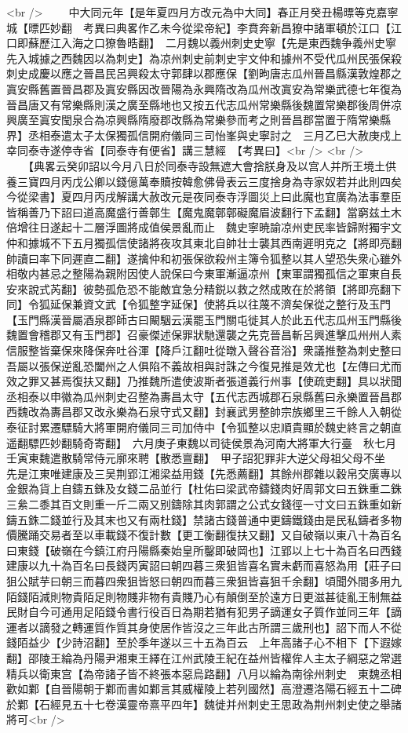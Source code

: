 <br />
　　中大同元年【是年夏四月方改元為中大同】春正月癸丑楊㬓等克嘉寧城【㬓匹妙翻　考異曰典畧作乙未今從梁帝紀】李賁奔新昌獠中諸軍頓於江口【江口即蘇歷江入海之口獠魯晧翻】　二月魏以義州刺史史寧【先是東西魏争義州史寧先入城據之西魏因以為刺史】為凉州刺史前刺史宇文仲和據州不受代瓜州民張保殺刺史成慶以應之晉昌民呂興殺太守郭肆以郡應保【劉昫唐志瓜州晉昌縣漢敦煌郡之寘安縣舊置晉昌郡及寘安縣因改晉陽為永興隋改為瓜州改寘安為常樂武德七年復為晉昌唐又有常樂縣則漢之廣至縣地也又按五代志瓜州常樂縣後魏置常樂郡後周併凉興廣至寘安閠泉合為凉興縣隋廢郡改縣為常樂參而考之則晉昌郡當置于隋常樂縣界】丞相泰遣太子太保獨孤信開府儀同三司怡峯與史寧討之　三月乙巳大赦庚戍上幸同泰寺遂停寺省【同泰寺有便省】講三慧經　【考異曰】<br />
<br />
　　【典畧云癸卯詔以今月八日於同泰寺設無遮大會捨朕身及以宫人并所王境土供養三寶四月丙戊公卿以錢億萬奉贖按韓愈佛骨表云三度捨身為寺家奴若并此則四矣今從梁書】夏四月丙戌解講大赦改元是夜同泰寺浮圖災上曰此魔也宜廣為法事羣臣皆稱善乃下詔曰道高魔盛行善鄣生【魔鬼魔鄣鄣礙魔眉波翻行下孟翻】當窮兹土木倍增往日遂起十二層浮圖將成值侯景亂而止　魏史寧暁諭凉州吏民率皆歸附獨宇文仲和據城不下五月獨孤信使諸將夜攻其東北自帥壮士襲其西南遲明克之【將即亮翻帥讀曰率下同遲直二翻】遂擒仲和初張保欲殺州主簿令狐整以其人望恐失衆心雖外相敬内甚忌之整陽為親附因使人說保曰今東軍漸逼凉州【東軍謂獨孤信之軍東自長安來說式芮翻】彼勢孤危恐不能敵宜急分精鋭以救之然成敗在於將領【將即亮翻下同】令狐延保兼資文武【令狐整字延保】使將兵以往蔑不濟矣保從之整行及玉門【玉門縣漢晉屬酒泉郡師古曰闞駰云漢罷玉門關屯徙其人於此五代志瓜州玉門縣後魏置會稽郡又有玉門郡】召豪傑述保罪狀馳還襲之先克晉昌斬呂興進擊瓜州州人素信服整皆棄保來降保奔吐谷渾【降戶江翻吐從暾入聲谷音浴】衆議推整為刺史整曰吾屬以張保逆亂恐闔州之人俱陷不義故相與討誅之今復見推是效尤也【左傳曰尤而效之罪又甚焉復扶又翻】乃推魏所遣使波斯者張道義行州事【使疏吏翻】具以狀聞丞相泰以申徽為瓜州刺史召整為夀昌太守【五代志西城郡石泉縣舊曰永樂置晉昌郡西魏改為夀昌郡又改永樂為石泉守式又翻】封襄武男整帥宗族鄉里三千餘人入朝從泰征討累遷驃騎大將軍開府儀同三司加侍中【令狐整以忠順貴顯於魏史終言之朝直遥翻驃匹妙翻騎奇寄翻】　六月庚子東魏以司徒侯景為河南大將軍大行臺　秋七月壬寅東魏遣散騎常侍元廓來聘【散悉亶翻】　甲子詔犯罪非大逆父母祖父母不坐　先是江東唯建康及三吴荆郢江湘梁益用錢【先悉薦翻】其餘州郡雜以穀帛交廣專以金銀為貨上自鑄五銖及女錢二品並行【杜佑曰梁武帝鑄錢肉好周郭文曰五銖重二銖三絫二黍其百文則重一斤二兩又别鑄除其肉郭謂之公式女錢徑一寸文曰五銖重如新鑄五銖二錢並行及其末也又有兩杜錢】禁諸古錢普通中更鑄鐵錢由是民私鑄者多物價騰踊交易者至以車載錢不復計數【更工衡翻復扶又翻】又自破嶺以東八十為百名曰東錢【破嶺在今鎮江府丹陽縣秦始皇所鑿即破岡也】江郢以上七十為百名曰西錢建康以九十為百名曰長錢丙寅詔曰朝四暮三衆狙皆喜名實未虧而喜怒為用【莊子曰狙公賦芋曰朝三而暮四衆狙皆怒曰朝四而暮三衆狙皆喜狙千余翻】頃聞外間多用九陌錢陌減則物貴陌足則物賤非物有貴賤乃心有顛倒至於遠方日更滋甚徒亂王制無益民財自今可通用足陌錢令書行役百日為期若猶有犯男子謫運女子質作並同三年【謫運者以謫發之轉運質作質其身使居作皆沒之三年此古所謂三歲刑也】詔下而人不從錢陌益少【少詩沼翻】至於季年遂以三十五為百云　上年高諸子心不相下【下遐嫁翻】邵陵王綸為丹陽尹湘東王繹在江州武陵王紀在益州皆權侔人主太子綱惡之常選精兵以衛東宫【為帝諸子皆不終張本惡烏路翻】八月以綸為南徐州刺史　東魏丞相歡如鄴【自晉陽朝于鄴而書如鄴言其威權陵上若列國然】高澄遷洛陽石經五十二碑於鄴【石經見五十七卷漢靈帝熹平四年】魏徙并州刺史王思政為荆州刺史使之舉諸將可<br />
